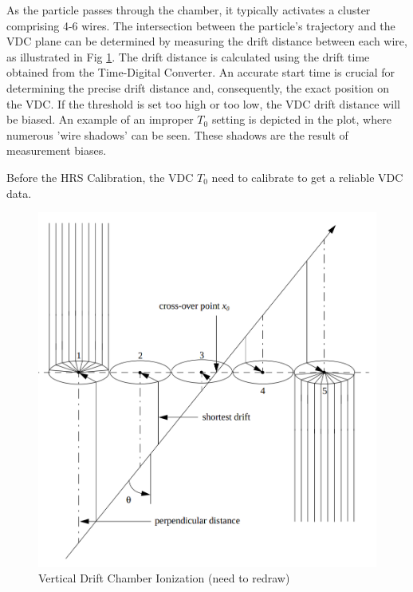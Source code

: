 As the particle passes through the chamber, it typically activates a cluster comprising 4-6 wires. The intersection between the particle's trajectory and the VDC plane can be determined by measuring the drift distance between each wire, as illustrated in Fig \ref{fig:vdc_wire_ionization_cluster}. The drift distance is calculated using the drift time obtained from the Time-Digital Converter. An accurate start time is crucial for determining the precise drift distance and, consequently, the exact position on the VDC. If the threshold is set too high or too low, the VDC drift distance will be biased. An example of an improper $T_0$ setting is depicted in the plot, where numerous 'wire shadows' can be seen. These shadows are the result of measurement biases. 

Before the HRS Calibration, the VDC $T_0$ need to calibrate to get a reliable VDC data. 
\begin{figure}[!htbp]
    \centering
    \includegraphics[scale = 0.25]{images/chap4/vdc_wire_ionize.png}
    \caption{Vertical Drift Chamber Ionization (need to redraw)}
    \label{fig:vdc_wire_ionization_cluster}
\end{figure}

